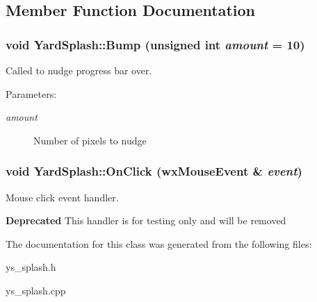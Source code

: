 \subsection{Member Function Documentation}
\subsubsection{\setlength{\rightskip}{0pt plus 5cm}void Yard\-Splash::Bump (unsigned int {\em amount} = 10)}\label{classYardSplash_a4}


Called to nudge progress bar over. 

\begin{Desc}
\item[Parameters:]
\begin{description}
\item[{\em amount}]Number of pixels to nudge \end{description}
\end{Desc}
\subsubsection{\setlength{\rightskip}{0pt plus 5cm}void Yard\-Splash::On\-Click (wx\-Mouse\-Event \& {\em event})}\label{classYardSplash_a2}


Mouse click event handler. 

\begin{Desc}
\item[{\bf Deprecated}]This handler is for testing only and will be removed \end{Desc}


The documentation for this class was generated from the following files:\begin{CompactItemize}
\item 
ys\_\-splash.h\item 
ys\_\-splash.cpp\end{CompactItemize}
